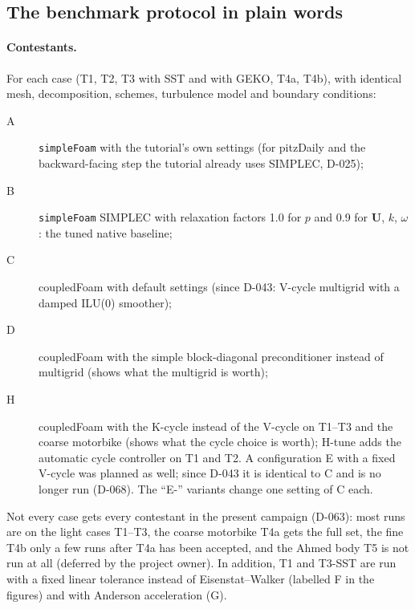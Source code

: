 \documentclass[11pt,a4paper]{article}
\newcommand{\vect}[1]{\mathbf{#1}}
\newcommand{\Uv}{\vect{U}}
\newcommand{\code}[1]{\texttt{#1}}
\begin{document}
\subsection{The benchmark protocol in plain words}\label{sec:protocol}

\paragraph{Contestants.} For each case (T1, T2, T3 with SST and with GEKO,
T4a, T4b), with identical mesh, decomposition, schemes, turbulence model
and boundary conditions:
\begin{description}
\item[A] \code{simpleFoam} with the tutorial's own settings (for pitzDaily
  and the backward-facing step the tutorial already uses SIMPLEC, D-025);
\item[B] \code{simpleFoam} SIMPLEC with relaxation factors 1.0 for $p$ and
  0.9 for $\Uv$, $k$, $\omega$: the tuned native baseline;
\item[C] coupledFoam with default settings (since D-043: V-cycle multigrid
  with a damped ILU(0) smoother);
\item[D] coupledFoam with the simple block-diagonal preconditioner instead
  of multigrid (shows what the multigrid is worth);
\item[H] coupledFoam with the K-cycle instead of the V-cycle on T1--T3 and
  the coarse motorbike (shows what the cycle choice is worth); H-tune adds
  the automatic cycle controller on T1 and T2. A configuration E with a
  fixed V-cycle was planned as well; since D-043 it is identical to C and
  is no longer run (D-068). The ``E-'' variants change one setting of C
  each.
\end{description}
Not every case gets every contestant in the present campaign (D-063): most
runs are on the light cases T1--T3, the coarse motorbike T4a gets the full
set, the fine T4b only a few runs after T4a has been accepted, and the Ahmed
body T5 is not run at all (deferred by the project owner).
In addition, T1 and T3-SST are run with a fixed linear tolerance instead of
Eisenstat--Walker (labelled F in the figures) and with Anderson acceleration
(G).
\end{document}
